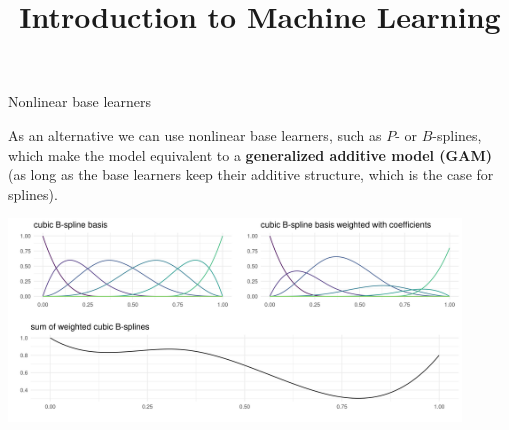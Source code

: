 \documentclass[11pt,compress,t,notes=noshow, xcolor=table]{beamer}
\title{Introduction to Machine Learning}
\date{}
\begin{document}


\begin{vbframe}{Nonlinear base learners}

As an alternative we can use nonlinear base learners, such as $P$- or
$B$-splines, which make the model equivalent to a
\textbf{generalized additive model (GAM)} (as long as the base learners keep
their additive structure, which is the case for splines).
\vspace{0.5cm}

\vfill

\begin{center}
\includegraphics[width=0.9\textwidth]{figure/bspline-basis.png}
\end{center}

%

\end{vbframe}




%
%
%
\end{document}
